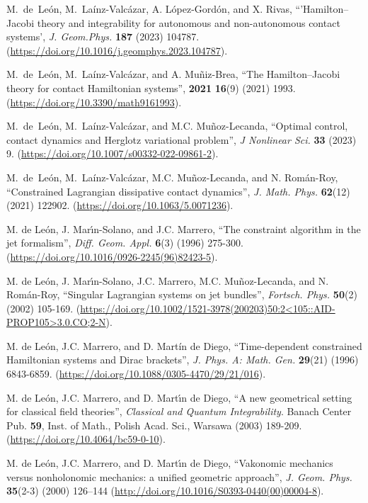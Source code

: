 \documentclass[12pt]{report}
\begin{document}
\begin{thebibliography}{999}
M.~de~Le{\'{o}}n, M.~La\'inz-Valc{\'{a}}zar,
A. L\'opez-Gord\'on, and X. Rivas,
``'Hamilton--Jacobi theory and integrability for autonomous and non-autonomous contact systems',
{\sl J. Geom.Phys.} {\bf 187} (2023) 104787.
(\url{https://doi.org/10.1016/j.geomphys.2023.104787}).

M.~de~Le{\'{o}}n, M.~La\'inz-Valc{\'{a}}zar,
and A. Mu\~niz-Brea,
``The Hamilton–Jacobi theory for contact Hamiltonian systems'',
 {\bf 2021} {\bf 16}(9) (2021) 1993. 
(\url{https://doi.org/10.3390/math9161993}).

M.~de~Le{\'{o}}n, M.~La\'inz-Valc{\'{a}}zar, and M.C. Mu\~noz-Lecanda,
``Optimal control, contact dynamics and Herglotz variational problem'',
{\sl J Nonlinear Sci.} {\bf 33} (2023) 9. (\url{https://doi.org/10.1007/s00332-022-09861-2}).

M.~de~Le{\'{o}}n, M.~La\'inz-Valc{\'{a}}zar, M.C. Mu\~noz-Lecanda, and N. Rom\'an-Roy,
``Constrained Lagrangian dissipative contact dynamics'',
{\sl J. Math. Phys.} {\bf 62}(12) (2021) 122902.
(\url{https://doi.org/10.1063/5.0071236}).

M. de Le\'on, J. Mar\'\i n-Solano, and J.C. Marrero,
 ``The constraint algorithm in the jet formalism'', {\sl Diff. Geom.
Appl.} {\bf 6}(3) (1996) 275-300.
(\url{https://doi.org/10.1016/0926-2245(96)82423-5}).

M. de Le\'on, J. Mar\'\i n-Solano, J.C. Marrero, M.C. Mu\~noz-Lecanda, and N. Rom\'an-Roy,
``Singular Lagrangian systems on jet bundles'',
{\sl Fortsch. Phys.} {\bf 50}(2) (2002) 105-169.
(\url{https://doi.org/10.1002/1521-3978(200203)50:2<105::AID-PROP105>3.0.CO;2-N}).

M. de Le\'on, J.C. Marrero, and D. Mart\'in de Diego,
``Time-dependent constrained Hamiltonian systems and Dirac brackets'',
{\sl J. Phys. A: Math. Gen.} {\bf 29}(21) (1996) 6843-6859.
(\url{https://doi.org/10.1088/0305-4470/29/21/016}).

M. de Le\'on, J.C. Marrero, and D. Mart\'\i n de Diego,
``A new geometrical setting for classical field theories'', 
{\sl Classical and Quantum Integrability}. 
Banach Center Pub. {\bf 59},
Inst. of Math., Polish Acad. Sci., Warsawa (2003) 189-209.
(\url{https://doi.org/10.4064/bc59-0-10}).

M. de Le\'on, J.C. Marrero, and D. Mart\'{\i}n de Diego,
``Vakonomic mechanics versus nonholonomic mechanics: a unified geometric approach'',
{\sl J. Geom. Phys.} {\bf 35}(2-3) (2000) 126--144 
(\url{http://doi.org/10.1016/S0393-0440(00)00004-8}).


\end{thebibliography}
\end{document}
